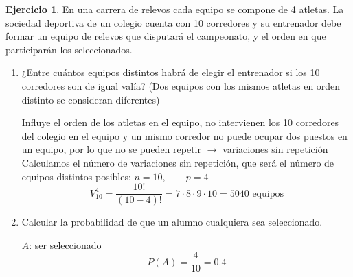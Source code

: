 \documentclass[a4paper, 12pt]{article}
\theoremstyle{definition}
\newtheorem{ej}{Ejercicio}
\begin{document}
\begin{ej}
En una carrera de relevos cada equipo se compone de 4 atletas. La sociedad deportiva de un colegio cuenta con 10 corredores y su entrenador debe formar un equipo de relevos que disputará el
campeonato, y el orden en que participarán los seleccionados.
\begin{enumerate}[label=\textit{\alph*)}]
\item ¿Entre cuántos equipos distintos habrá de elegir el entrenador si los 10 corredores son de
igual valía? (Dos equipos con los mismos atletas en orden distinto se consideran diferentes)

\medskip

Influye el orden de los atletas en el equipo, no intervienen los 10 corredores del colegio en el equipo y un mismo corredor no puede ocupar dos puestos en un equipo, por lo que no se pueden repetir $\longrightarrow$ variaciones sin repetición \\
Calculamos el número de variaciones sin repetición, que será el número de equipos distintos posibles; $n = 10,\qquad p = 4$
\[V^4_{10} = \frac{10!}{(10-4)!} = 7\cdot8\cdot9\cdot10 = 5040\text{  equipos}\]
\item Calcular la probabilidad de que un alumno cualquiera sea seleccionado.

\medskip

$A$: ser seleccionado
\[P(A) = \frac{4}{10} = \underline{0.4}\]

\end{enumerate}
\end{ej}

\medskip
\end{document}
